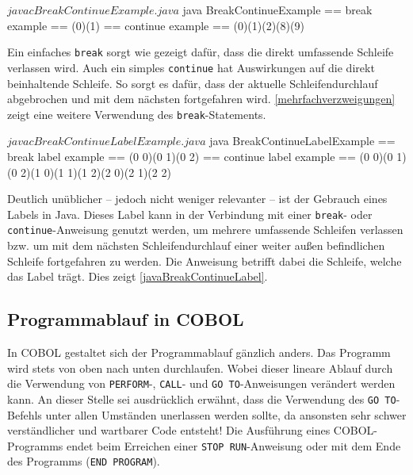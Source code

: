 \sepCodeAndOutputCheck
\begin{shellwindow}
$ javac BreakContinueExample.java 
$ java BreakContinueExample
== break example == 
(0)(1)
== continue example == 
(0)(1)(2)(8)(9)
\end{shellwindow}

Ein einfaches \texttt{break} sorgt wie gezeigt dafür, dass die direkt umfassende Schleife verlassen wird. Auch ein simples \texttt{continue} hat Auswirkungen auf die direkt beinhaltende Schleife. So sorgt es dafür, dass der aktuelle Schleifendurchlauf abgebrochen und mit dem nächsten fortgefahren wird. \autoref{mehrfachverzweigungen} zeigt eine weitere Verwendung des \texttt{break}-Statements.

\sepCodeAndOutputCheck
\begin{shellwindow}
$ javac BreakContinueLabelExample.java 
$ java BreakContinueLabelExample
== break label example == 
(0 0)(0 1)(0 2)
== continue label example == 
(0 0)(0 1)(0 2)(1 0)(1 1)(1 2)(2 0)(2 1)(2 2)
\end{shellwindow}

Deutlich unüblicher -- jedoch nicht weniger relevanter -- ist der Gebrauch eines Labels in Java. Dieses Label kann in der Verbindung mit einer \texttt{break}- oder \texttt{continue}-Anweisung genutzt werden, um mehrere umfassende Schleifen verlassen bzw. um mit dem nächsten Schleifendurchlauf einer weiter außen befindlichen Schleife fortgefahren zu werden. Die Anweisung betrifft dabei die Schleife, welche das Label trägt. Dies zeigt \autoref{javaBreakContinueLabel}.

\subsection*{Programmablauf in COBOL}

In COBOL gestaltet sich der Programmablauf gänzlich anders. Das Programm wird stets von oben nach unten durchlaufen. Wobei dieser lineare Ablauf durch die Verwendung von \texttt{PERFORM}-, \texttt{CALL}- und \texttt{GO TO}-Anweisungen verändert werden kann. An dieser Stelle sei ausdrücklich erwähnt, dass die Verwendung des \texttt{GO TO}-Befehls unter allen Umständen unerlassen werden sollte, da ansonsten sehr schwer verständlicher und wartbarer Code entsteht! Die Ausführung eines COBOL-Programms endet beim Erreichen einer \texttt{STOP RUN}-Anweisung oder mit dem Ende des Programms (\texttt{END PROGRAM}).\\


